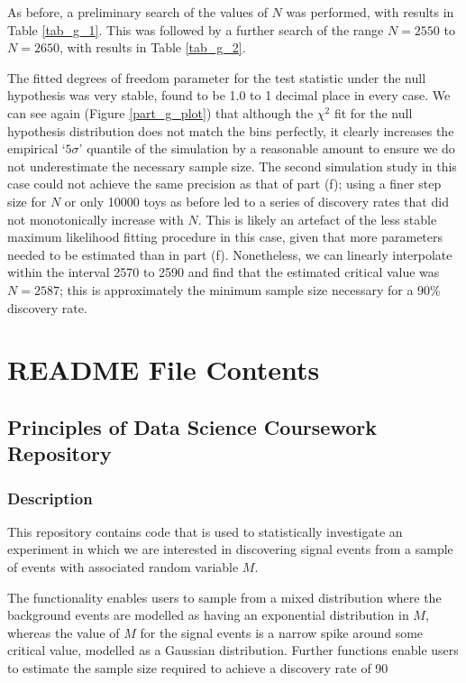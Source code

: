 \documentclass[12pt]{article}
\begin{document}
As before, a preliminary search of the values of $N$ was performed, with results in Table \ref{tab_g_1}.
This was followed by a further search of the range $N=2550$ to $N=2650$, with results in Table \ref{tab_g_2}.

The fitted degrees of freedom parameter for the test statistic under the null hypothesis was very stable, found to be 1.0 to 1 decimal place in every case.
We can see again (Figure \ref{part_g_plot}) that although the $\chi^2$ fit for the null hypothesis distribution does not match the bins perfectly, it clearly increases the empirical `$5\sigma$' quantile of the simulation by a reasonable amount to ensure we do not underestimate the necessary sample size.
The second simulation study in this case could not achieve the same precision as that of part (f); using a finer step size for $N$ or only 10000 toys as before led to a series of discovery rates that did not monotonically increase with $N$.
This is likely an artefact of the less stable maximum likelihood fitting procedure in this case, given that more parameters needed to be estimated than in part (f).
Nonetheless, we can linearly interpolate within the interval 2570 to 2590 and find that the estimated critical value was $N=2587$; this is approximately the minimum sample size necessary for a 90\% discovery rate.





\appendix
\section*{README File Contents}

\subsection*{Principles of Data Science Coursework Repository}

\subsubsection*{Description}
This repository contains code that is used to statistically investigate an experiment in which we are interested in discovering signal events from a sample of events with associated random variable $M$.

The functionality enables users to sample from a mixed distribution where the background events are modelled as having an exponential distribution in $M$, whereas the value of $M$ for the signal events is a narrow spike around some critical value, modelled as a Gaussian distribution. Further functions enable users to estimate the sample size required to achieve a discovery rate of 90%
\end{document}
